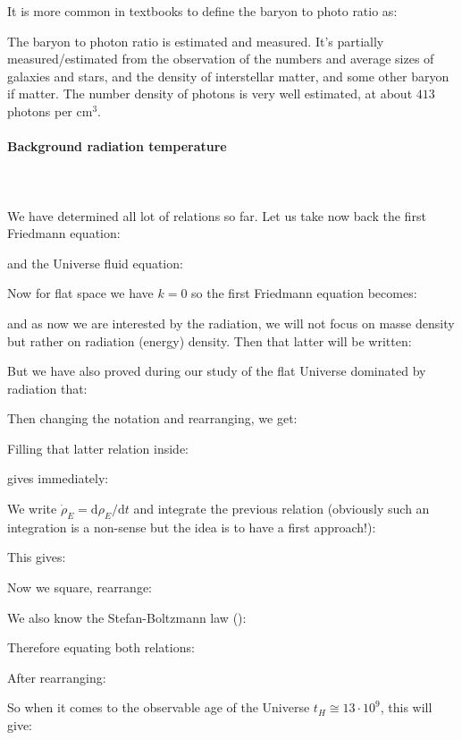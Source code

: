 	\begin{tcolorbox}[title=Remark,colframe=black,arc=10pt]
	It is more common in textbooks to define the baryon to photo ratio as:
	
	The baryon to photon ratio is estimated and measured. It's partially measured/estimated from the observation of the numbers and average sizes of galaxies and stars, and the density of interstellar matter, and some other baryon if matter. The number density of photons is very well estimated, at about $413$ photons per $\text{cm}^3$.
	\end{tcolorbox}
	
	\paragraph{Background radiation temperature}\mbox{}\\\\
	We have determined all lot of relations so far. Let us take now back the first Friedmann equation:
	
	and the Universe fluid equation:
	
	Now for flat space we have $k=0$ so the first Friedmann equation becomes:
	
	and as now we are interested by the radiation, we will not focus on masse density but rather on radiation (energy) density. Then that latter will be written:
	
	But we have also proved during our study of the flat Universe dominated by radiation that:
	
	Then changing the notation and rearranging, we get:
	
	Filling that latter relation inside:
	
	gives immediately:
	
	We write $\dot{\rho}_E=\mathrm{d}\rho_E/\mathrm{d}t$ and integrate the previous relation (obviously such an integration is a non-sense but the idea is to have a first approach!):
	
	This gives:
	
	Now we square, rearrange:
	
	We also know the Stefan-Boltzmann law ():
	
	Therefore equating both relations:
	
	After rearranging:
	
	So when it comes to the observable age of the Universe $t_H\cong 13\cdot 10^9$, this will give:
	
